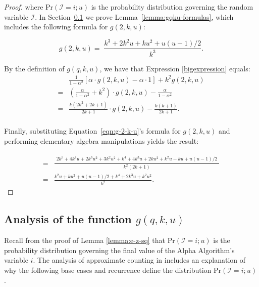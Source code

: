 \documentclass{article}
\begin{document}
\begin{proof}
\noindent where $\mathrm{Pr}(\mathcal{I}\!=\!i;u)$ is the probability distribution 
governing the random variable $\mathcal{I}$.
In Section~\ref{gqku-section} we prove Lemma~\ref{lemma:gqku-formulas}, which includes the following 
formula for $g(2,k,u)$:

\begin{equation}
g(2,k,u) = \;\frac{k^3 + 2 k^2 u + ku^2 + u(u\!-\!1)/2}{k^3}. \label{eqn:g-2-k-u}
\end{equation}

By the definition of $g(q, k, u)$, we have that Expression \eqref{bigexpression} equals:
 \begin{align*}
& \frac{1}{1-\alpha^2} 
\left[ \alpha \cdot g(2,k,u) - \alpha \cdot 1 \right] + k^2 g(2,k,u) \\
= & \left(\frac{\alpha}{1-\alpha^2} + k^2\right) \cdot g(2,k,u) - \frac{\alpha}{1-\alpha^2} \\
= & \frac{k(2k^2+2k+1)}{2k+1}
\cdot g(2,k,u) - 
\frac{k(k+1)}{2k+1}. \\
\end{align*}

\noindent Finally, substituting Equation~\eqref{eqn:g-2-k-u}'s formula for $g(2,k,u)$ and performing
elementary algebra manipulations yields the result:

\begin{align*}
= & \frac{
\begin{array}{c}
2k^5 + 4k^4u + 2k^3u^2 + 3k^2u^2 + k^4 + 4k^3u + 2ku^2 + k^2u - ku + u(u-1)/2
\end{array}
}{k^2 (2k+1)} \\
= & \frac{k^2u + ku^2 + u(u\!-\!1)/2 + k^4 + 2k^3u + k^2u^2}{k^2}.
\end{align*}
\end{proof}




\subsection{Analysis of the function $g(q,k,u)$}\label{gqku-section}

Recall from the proof of Lemma \ref{lemma:e-z-sq} that $\mathrm{Pr}(\mathcal{I}\!=\!i ; u)$ is the probability distribution
governing the final value of the Alpha Algorithm's variable $i$. The analysis
of approximate counting in \cite{flajolet1985approximate} includes an explanation
of why the following base cases and
recurrence define the distribution $\mathrm{Pr}(\mathcal{I}\!=\!i ; u)$.
\end{document}
